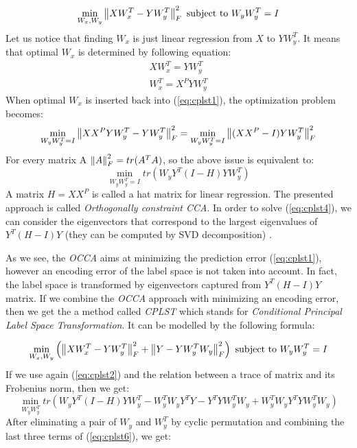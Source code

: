 \begin{equation}\label{eq:cplst1}
    \min_{W_x, W_y} \left\lVert XW_x^T-YW_y^T\right\rVert_{F}^2  
    \text{  subject to   } W_yW_y^T=I   
\end{equation}
Let us notice that finding $W_x$ is just linear regression from $X$ to $YW_y^T$. It means that optimal $W_x$ is determined by following equation:
\begin{equation}\label{eq:cplst2}
\begin{split}
    XW_x^T=YW_y^T \\
    W_x^T=X^PYW_y^T
\end{split}
\end{equation}
When optimal $W_x$ is inserted back into (\ref{eq:cplst1}), the optimization problem becomes:
\begin{equation}\label{eq:cplst3}
    \min_{W_yW_y^T=I} \left\lVert XX^PYW_y^T-YW_y^T\right\rVert_{F}^2=\min_{W_yW_y^T=I} \left\lVert(XX^P-I)YW_y^T\right\rVert_{F}^2
\end{equation}
For every matrix A $\left\lVert A\right\rVert_{F}^2=tr(A^TA)$, so the above issue is equivalent to:
\begin{equation}\label{eq:cplst4}
    \min_{W_yW_y^T=I} tr(W_yY^T(I-H)YW_y^T)
\end{equation}
A matrix $H=XX^P$ is called a hat matrix for linear regression. The presented approach is called \textit{Orthogonally constraint CCA}. In order to solve (\ref{eq:cplst4}), we can consider the eigenvectors that correspond to the largest eigenvalues of $Y^T(H-I)Y$ (they can be computed by SVD decomposition) \cite{ChenLin}.

As we see, the \textit{OCCA} aims at minimizing the prediction error (\ref{eq:cplst1}), however an encoding error of the label space is not taken into account. In fact, the label space is transformed by eigenvectors captured from $Y^T(H-I)Y$ matrix. If we combine the \textit{OCCA} approach with minimizing an encoding error, then we get the a method called \textit{CPLST} which stands for \textit{Conditional Principal Label Space Transformation}. It can be modelled by the following formula:

\begin{equation}\label{eq:cplst5}
    \min_{W_x, W_y} \left(\left\lVert XW_x^T-YW_y^T\right\rVert_{F}^2 + \left\lVert Y-YW_y^TW_y\right\rVert_{F}^2\right)  
    \text{  subject to   } W_yW_y^T=I   
\end{equation}
If we use again (\ref{eq:cplst2}) and the relation between a trace of matrix and its Frobenius norm, then we get:
\begin{equation}\label{eq:cplst6}
    \min_{W_yW_y^T} tr(W_yY^T(I-H)YW_y^T-W_y^TW_yY^TY-Y^TYW_y^TW_y+W_y^TW_yY^TYW_y^TW_y)  
\end{equation}
After eliminating a pair of $W_y$ and $W_y^T$ by cyclic permutation and combining the last three terms of (\ref{eq:cplst6}), we get:

